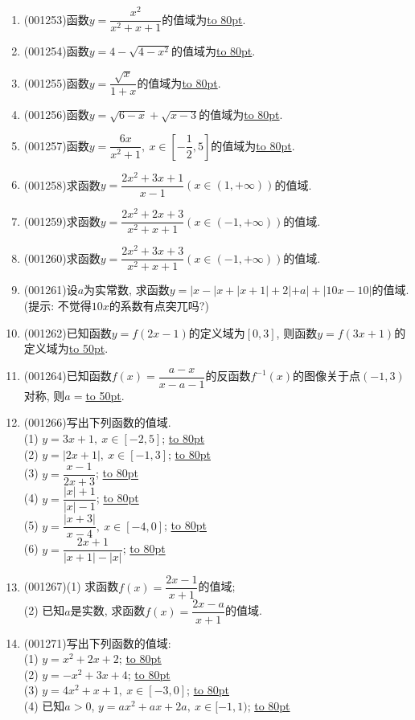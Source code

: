 \documentclass[10pt,a4paper]{article}
\newcommand{\blank}[1]{\underline{\hbox to #1pt{}}}
\begin{document}
\begin{enumerate}[1.]
\item {\tiny (001253)}函数$y=\dfrac{x^2}{x^2+x+1}$的值域为\blank{80}.
\item {\tiny (001254)}函数$y=4-\sqrt{4-x^2}$的值域为\blank{80}.
\item {\tiny (001255)}函数$y=\dfrac{\sqrt{x}}{1+x}$的值域为\blank{80}.
\item {\tiny (001256)}函数$y=\sqrt{6-x}+\sqrt{x-3}$的值域为\blank{80}.
\item {\tiny (001257)}函数$y=\dfrac{6x}{x^2+1}, \ x \in [-\dfrac{1}{2},5]$的值域为\blank{80}.
\item {\tiny (001258)}求函数$y=\dfrac{2x^2+3x+1}{x-1}(x\in(1,+\infty))$的值域.
\item {\tiny (001259)}求函数$y=\dfrac{2x^2+2x+3}{x^2+x+1}(x\in(-1,+\infty))$的值域.
\item {\tiny (001260)}求函数$y=\dfrac{2x^2+3x+3}{x^2+x+1}(x\in(-1,+\infty))$的值域.
\item {\tiny (001261)}设$a$为实常数, 求函数$y=|x-|x+|x+1|+2|+a|+|10x-10|$的值域. (提示: 不觉得$10x$的系数有点突兀吗?)
\item {\tiny (001262)}已知函数$y=f(2x-1)$的定义域为$[0,3]$, 则函数$y=f(3x+1)$的定义域为\blank{50}.
\item {\tiny (001264)}已知函数$f(x)=\dfrac{a-x}{x-a-1}$的反函数$f^{-1}(x)$的图像关于点$(-1,3)$对称, 则$a=$\blank{50}.
\item {\tiny (001266)}写出下列函数的值域.\\ 
(1) $y=3x+1, \ x \in [-2,5]$; \blank{80}\\ 
(2) $y=|2x+1|, \ x \in [-1,3]$; \blank{80}\\ 
(3) $y=\dfrac{x-1}{2x+3}$; \blank{80}\\ 
(4) $y=\dfrac{|x|+1}{|x|-1}$; \blank{80}\\ 
(5) $y=\dfrac{|x+3|}{x-4}, \ x \in [-4,0]$; \blank{80}\\ 
(6) $y=\dfrac{2x+1}{|x+1|-|x|}$; \blank{80}
\item {\tiny (001267)}(1) 求函数$f(x)=\dfrac{2x-1}{x+1}$的值域;\\ 
(2) 已知$a$是实数, 求函数$f(x)=\dfrac{2x-a}{x+1}$的值域.
\item {\tiny (001271)}写出下列函数的值域:\\ 
(1) $y=x^2+2x+2$; \blank{80}\\ 
(2) $y=-x^2+3x+4$; \blank{80}\\ 
(3) $y=4x^2+x+1, \ x \in [-3,0]$; \blank{80}\\ 
(4) 已知$a>0$, $y=ax^2+ax+2a, \ x \in [-1,1)$; \blank{80}\\ 

\end{enumerate}
\end{document}
